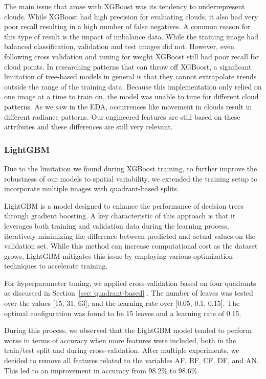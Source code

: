 \documentclass[10pt,letterpaper]{article}
\begin{document}
The main issue that arose with XGBoost was its tendency to underrepresent clouds. While XGBoost had high precision for evaluating clouds, it also had very poor recall resulting in a high number of false negatives. A common reason for this type of result is the impact of imbalance data. While the training image had balanced classification, validation and test images did not. However, even following cross validation and tuning for weight XGBoost still had poor recall for cloud points. In researching patterns that can throw off XGBoost, a significant limitation of tree-based models in general is that they cannot extrapolate trends outside the range of the training data. Because this implementation only relied on one image at a time to train on, the model was unable to tune for different cloud patterns. As we saw in the EDA, occurrences like movement in clouds result in different radiance patterns. Our engineered features are still based on these attributes and these differences are still very relevant.



\subsubsection{LightGBM}


Due to the limitation we found during XGBoost training, to further improve the robustness of our models to spatial variability, we extended the training setup to incorporate multiple images with quadrant-based splits.

LightGBM is a model designed to enhance the performance of decision trees through gradient boosting. A key characteristic of this approach is that it leverages both training and validation data during the learning process, iteratively minimizing the difference between predicted and actual values on the validation set. While this method can increase computational cost as the dataset grows, LightGBM mitigates this issue by employing various optimization techniques to accelerate training.

For hyperparameter tuning, we applied cross-validation based on four quadrants as discussed in Section~\ref{sec: quadrant-based} . The number of leaves was tested over the values [15, 31, 63], and the learning rate over [0.05, 0.1, 0.15]. The optimal configuration was found to be 15 leaves and a learning rate of 0.15. 

During this process, we observed that the LightGBM model tended to perform worse in terms of accuracy when more features were included, both in the train/test split and during cross-validation. After multiple experiments, we decided to remove all features related to the variables AF, BF, CF, DF, and AN. This led to an improvement in accuracy from 98.2\% to 98.6\%. 
\end{document}
